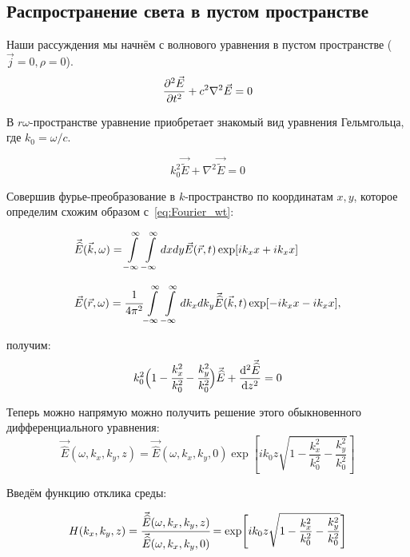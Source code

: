 \documentclass[14pt,a4paper]{extarticle}
\numberwithin{equation}{section}
\begin{document}
\subsection{Распространение света в пустом пространстве}
Наши рассуждения мы начнём с волнового уравнения в пустом пространстве ($\vec{j} = 0, \rho = 0$). 
\begin{equation}
	\pdv[2]{\vec{E}}{t} + c^2 \nabla^2 \vec{E} = 0
\end{equation}

В  $r\omega$-пространстве уравнение приобретает знакомый вид уравнения Гельмгольца, где $k_0 = \omega/c$.

\begin{equation}
	k_0^2\vec{\widetilde{E}} + \nabla^2 \vec{\widetilde{E}} = 0
\end{equation}

Совершив фурье-преобразование в $k$-пространство по координатам $x,y$, которое определим схожим образом с~\ref{eq:Fourier_wt}:

\begin{equation}
	\label{eq:Fourier_rk}
		\begin{array}{lcl}
		\vec{\widehat{E}}(\vec{k}, \omega) = \displaystyle\int\limits_{-\infty}^{\infty}\int\limits_{-\infty}^{\infty} dxdy \vec{E}(\vec{r}, t)\exp[ik_xx + ik_xx]\\
		\\
		\vec{E}(\vec{r}, \omega) = \cfrac{1}{4\pi^2}\displaystyle\int\limits_{-\infty}^{\infty}\int\limits_{-\infty}^{\infty} dk_xdk_y \vec{\widehat{E}}(\vec{k}, t)\exp[-ik_xx - ik_xx],
	\end{array}
\end{equation}

получим: 
\begin{equation}
	k_0^2\Big(1 - \cfrac{k^2_x}{k^2_0} - \cfrac{k^2_y}{k^2_0} \Big)\vec{\widehat{E}} + \dv[2]{\vec{\widehat{E}}}{z} = 0
\end{equation}

Теперь можно напрямую можно получить решение этого обыкновенного дифференциального уравнения:
\begin{equation}
	\vec{\widehat{E}}(\omega, k_x, k_y, z) = \vec{\widehat{E}}(\omega, k_x, k_y, 0)\exp[ik_0z\sqrt{1 - \frac{k^2_x}{k^2_0} - \frac{k^2_y}{k^2_0}} ]
\end{equation}

Введём функцию отклика среды:

\begin{equation}
	H(k_x, k_y, z) = \cfrac{\vec{\widehat{E}}(\omega, k_x, k_y, z)}{\vec{\widehat{E}}(\omega, k_x, k_y, 0)} = \exp[ik_0z\sqrt{1 - \frac{k^2_x}{k^2_0} - \frac{k^2_y}{k^2_0}} ]
\end{equation}
 
\end{document}

